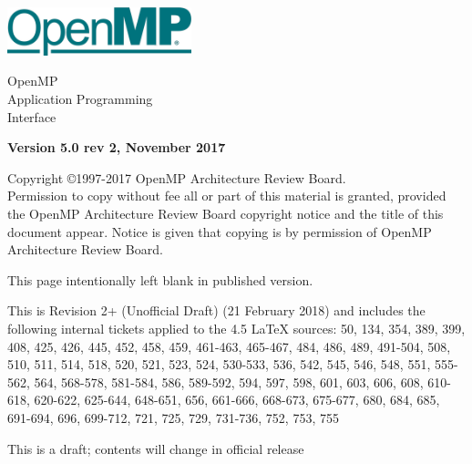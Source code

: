 
  \begin{titlepage}
    \begin{flushleft}
     \hspace{-6em} \includegraphics[width=0.4\textwidth]{openmp-logo.png}
    \end{flushleft}

    \begin{adjustwidth}{-0.75in}{0in}
    \begin{center}
      \Huge
      \textsf{OpenMP\\Application Programming\\Interface}

      \vspace{0.5in}\textsf{    }\vspace{-0.7in}
      \normalsize

      \vspace{1.0in}

      \textbf{Version 5.0 rev 2, November 2017}
    \end{center}
    \end{adjustwidth}

    \vspace{3.0in}

\begin{adjustwidth}{0pt}{1em}\setlength{\parskip}{0.25\baselineskip}%
Copyright \copyright 1997-2017 OpenMP Architecture Review Board.\\
Permission to copy without fee all or part of this material is granted,
provided the OpenMP Architecture Review Board copyright notice and
the title of this document appear. Notice is given that copying is by
permission of OpenMP Architecture Review Board.\end{adjustwidth}

  \end{titlepage}


\clearpage
\thispagestyle{empty}
\phantom{a}
This page intentionally left blank in published version.

This is Revision 2+ (Unofficial Draft) (21 February 2018) and
includes the following internal tickets applied to the 4.5 LaTeX sources:
50, 134, 354, 389, 399, 408, 425, 426, 445, 452, 458, 459, 461-463, 465-467, 
484, 486, 489, 491-504, 508, 510, 511, 514, 518, 520, 521, 523, 524, 530-533, 
536, 542, 545, 546, 548, 551, 555-562, 564, 568-578, 581-584, 586, 589-592, 
594, 597, 598, 601, 603, 606, 608, 610-618, 620-622, 625-644, 648-651, 
656, 661-666, 668-673, 675-677, 680, 684, 685, 691-694, 696, 699-712, 
721, 725, 729, 731-736, 752, 753, 755

This is a draft; contents will change in official release

\vfill

